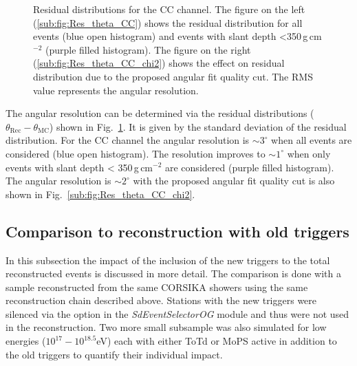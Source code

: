 \begin{figure}[h!]
  \centering
  \hfill
  \caption{Residual distributions for the CC channel. The figure on the left (\ref{sub:fig:Res_theta_CC}) shows the residual distribution for all events (blue open histogram) and events with slant depth <350\,g\,cm$^{-2}$ (purple filled histogram). The figure on the right (\ref{sub:fig:Res_theta_CC_chi2}) shows the effect on residual distribution due to the proposed angular fit quality cut. The RMS value represents the angular resolution.}
  \label{fig:Res_Theta}
\end{figure}

The angular resolution can be determined via the residual distributions ($\theta_{\text{Rec}} - \theta_{\text{MC}}$) shown in Fig.~\ref{fig:Res_Theta}. It is given by the standard deviation of the residual distribution. For the CC channel the angular resolution is $\sim3^{\circ}$ when all events are considered (blue open histogram). The resolution improves to $\sim1^{\circ}$ when only events with slant depth < 350\,g\,cm$^{-2}$ are considered (purple filled histogram). The angular resolution is $\sim2^{\circ}$ with the proposed angular fit quality cut is also shown in Fig.~\ref{sub:fig:Res_theta_CC_chi2}. 
\FloatBarrier
\subsection{Comparison to reconstruction with old triggers}
\label{subsec:old_trig_comp}
In this subsection the impact of the inclusion of the new triggers to the total reconstructed events is discussed in more detail. The comparison is done with a sample reconstructed from the same CORSIKA showers using the same reconstruction chain described above. Stations with the new triggers were silenced via the option in the \textit{SdEventSelectorOG} module and thus were not used in the reconstruction. Two more small subsample was also simulated for low energies ($10^{17}-10^{18.5}$eV) each with either ToTd or MoPS active in addition to the old triggers to quantify their individual impact. 

